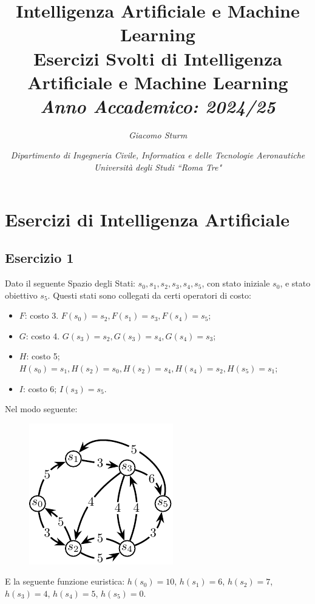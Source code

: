 \documentclass{article}
\numberwithin{equation}{section}
\begin{document}
\title{%
    \textbf{Intelligenza Artificiale e Machine Learning}  \\ 
    \large Esercizi Svolti di Intelligenza Artificiale e Machine Learning \\
    \textit{Anno Accademico: 2024/25}}
\author{\textit{Giacomo Sturm}}
\date{\textit{Dipartimento di Ingegneria Civile, Informatica e delle Tecnologie Aeronautiche \\
Università degli Studi ``Roma Tre"}}

\maketitle
\thispagestyle{link}

\clearpage


\pagestyle{fancy}
\fancyhead{}\fancyfoot{}
\fancyfoot[C]{\thepage}

\tableofcontents

\clearpage
{}

\section{Esercizi di Intelligenza Artificiale}

\subsection{Esercizio 1}

Dato il seguente Spazio degli Stati: $s_0,s_1,s_2,s_3,s_4,s_5$, con stato iniziale $s_0$, e stato obiettivo $s_5$. 
Questi stati sono collegati da certi operatori di costo:
\begin{itemize}
    \item $F$: costo 3. $F(s_0)=s_2, F(s_1)=s_3, F(s_4)=s_5$;
    \item $G$: costo 4. $G(s_3)=s_2, G(s_3)=s_4, G(s_4)=s_3$;
    \item $H$: costo 5; $H(s_0)=s_1, H(s_2)=s_0, H(s_2)=s_4, H(s_4)=s_2, H(s_5)=s_1$;
    \item $I$: costo 6; $I(s_3)=s_5$.
\end{itemize}
Nel modo seguente: 

\begin{figure}[H]%
    \centering%
    \includegraphics[scale=1.2]{grafo_esercitazione_1.pdf}%
\end{figure}
E la seguente funzione euristica: $h(s_0)=10$, $h(s_1)=6$, $h(s_2)=7$, $h(s_3)=4$, $h(s_4)=5$, $h(s_5)=0$. 
\end{document}
